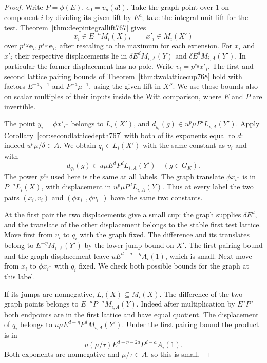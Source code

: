 \documentclass[a4paper,11pt]{article}
\theoremstyle{definition}
\theoremstyle{remark}
\numberwithin{equation}{section}
\begin{document}
\begin{proof}
Write \(P=\phi(E)\), \(e_0=v_p(d!)\). Take the graph
point over \(1\) on component \(i\) by dividing its
given lift by \(E^a\); take the integral unit lift for
the test. Theorem~\ref{thm:deepintegrallift767} gives
\[
     x_i\in E^{-a}M_i(X),\qquad x'_i\in M_i(X')
\]
over \(p^{s_X}\mathbf e_i,p^{s_{X'}}\mathbf e_i\), after
rescaling to the maximum for each extension. For \(x_i\)
and \(x'_i\) their respective displacements lie in
\(\delta E^d M_{i,A}(Y)\) and \(\delta E^d M_{i,A}(Y')\).
In particular the former displacement has no pole. Write
\(v_i=p^{e_0}x'_i\). The first and second lattice pairing
bounds of Theorem~\ref{thm:twolatticecup768} hold with
factors \(E^{-a}\tau^{-1}\) and \(P^{-a}\mu^{-1}\),
using the given lift in \(X''\). We use those bounds also
on scalar multiples of their inputs inside the Witt
comparison, where \(E\) and \(P\) are invertible.

The point \(y_i=\phi x'_{i^-}\) belongs to \(L_i(X')\),
and \(d_{y_i}(g)\in u^p\mu P^d L_{i,A}(Y')\).
Apply Corollary~\ref{cor:secondlatticedepth767} with both
of its exponents equal to \(d\): indeed
\(u^p\mu/\delta\in A\). We obtain \(q_i\in L_i(X')\)
with the same constant as \(v_i\) and with
\[
       d_{q_i}(g)\in u\mu E^d P^d L_{i,A}(Y')
                      \quad(g\in G_K).
\]
The power \(p^{e_0}\) used here is the same at all labels.
The graph translate \(\phi x_{i^-}\) is in
\(P^{-a}L_i(X)\), with displacement in
\(u^p\mu P^d L_{i,A}(Y)\). Thus at every label the two
pairs \((x_i,v_i)\) and \((\phi x_{i^-},\phi v_{i^-})\)
have the same two constants.

At the first pair the two displacements give a small cup:
the graph supplies \(\delta E^d\), and the translate of
the other displacement belongs to the stable first test
lattice. Move first from \(v_i\) to \(q_i\) with the
graph fixed. The difference and its translates belong to
\(E^{-\eta}M_{i,A}(Y')\) by the lower jump bound on \(X'\).
The first pairing bound and the graph displacement leave
\(uE^{d-a-\eta}A_i(1)\), which is small. Next move from
\(x_i\) to \(\phi x_{i^-}\) with \(q_i\) fixed. We check
both possible bounds for the graph at this label.

If its jumps are nonnegative, \(L_i(X)\subseteq M_i(X)\).
The difference of the two graph points belongs to
\(E^{-a}P^{-a}M_{i,A}(Y)\). Indeed after multiplication
by \(E^aP^a\) both endpoints are in the first lattice
and have equal quotient. The displacement of \(q_i\)
belongs to \(u\mu E^{d-\eta}P^d M_{i,A}(Y')\).
Under the first pairing bound the product is in
\[
        u(\mu/\tau) E^{d-\eta-2a}P^{d-a} A_i(1).
\]
Both exponents are nonnegative and \(\mu/\tau\in A\),
so this is small.


\end{proof}
\end{document}
